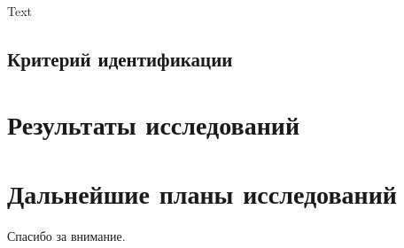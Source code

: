 \documentclass{beamer}
\begin{document}
\begin{frame}{\secname}{\subsecname}
  Text
\end{frame}


\subsection{Критерий идентификации}

\section{Результаты исследований}

\section{Дальнейшие планы исследований}

\begin{frame}
\begin{center}
  \LARGE{Спасибо за внимание.}
\end{center}
\end{frame}

\frame{\titlepage}
\end{document}
